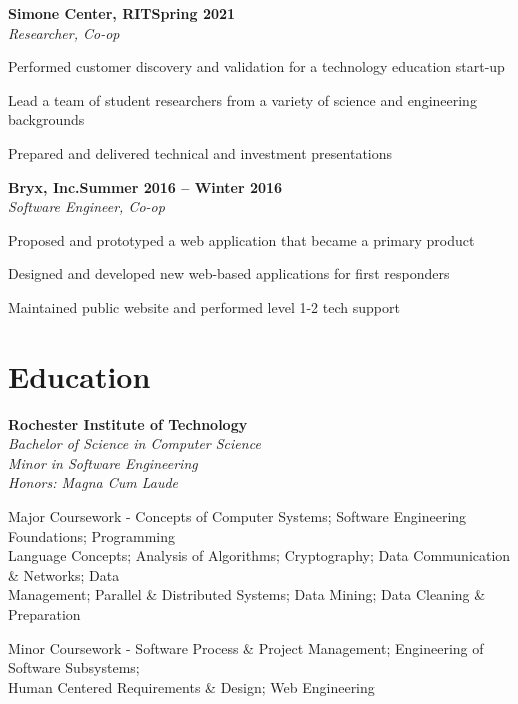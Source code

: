 \documentclass[letterpaper,10pt]{article}
\newcommand{\heading}[2]{
  \hspace{10pt}#1\hfill#2\\
}
\newcommand{\headingBf}[2]{
  \heading{\textbf{#1}}{\textbf{#2}}
}
\newcommand{\headingIt}[2]{
  \heading{\textit{#1}}{\textit{#2}}
}
\newenvironment{resume_list}{
  \vspace{-7pt}
  \begin{itemize}[itemsep=-2px, parsep=1pt, leftmargin=30pt]
}{
  \end{itemize}
}
\begin{document}
  \headingBf{Simone Center, RIT}{Spring 2021}
  \headingIt{Researcher, Co-op}{}
  \begin{resume_list}
   \item Performed customer discovery and validation for a technology education start-up
   \item Lead a team of student researchers from a variety of science and engineering backgrounds
   \item Prepared and delivered technical and investment presentations
  \end{resume_list}

  \headingBf{Bryx, Inc.}{Summer 2016 -- Winter 2016}
  \headingIt{Software Engineer, Co-op}{}
  \begin{resume_list}
   \item Proposed and prototyped a web application that became a primary product
   \item Designed and developed new web-based applications for first responders
   \item Maintained public website and performed level 1-2 tech support
  \end{resume_list}


  \section{Education}

  \headingBf{Rochester Institute of Technology}{} %
  \headingIt{Bachelor of Science in Computer Science}{}
  \headingIt{Minor in Software Engineering}{}
  \headingIt{Honors: Magna Cum Laude}{}
  \begin{resume_list}
    \item Major Coursework \hspace{2pt}- Concepts of Computer Systems; Software Engineering Foundations; Programming \\Language Concepts; Analysis of Algorithms; Cryptography; Data Communication \& Networks; Data \\Management; Parallel \& Distributed Systems; Data Mining; Data Cleaning \& Preparation
    \item Minor Coursework - Software Process \& Project Management; Engineering of Software Subsystems; \\Human Centered Requirements \& Design; Web Engineering
  \end{resume_list}
\end{document}
